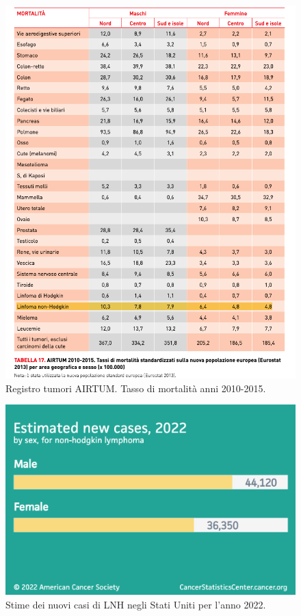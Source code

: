 \begin{figure}[h]
    \begin{center}
    \includegraphics[width=0.8\columnwidth]{img/MORTALITA.png}
    \end{center}
    \caption[Registro tumori AIRTUM. Tasso di mortalità anni 2010-2015.]{Registro tumori AIRTUM. Tasso di mortalità anni 2010-2015.
    \cite{img7}}

\end{figure}

\begin{figure}[h]
    \begin{center}
    \includegraphics[width=0.6\columnwidth]{img/Estimated new cases, 2022 (by sex).png}
    \end{center}
    \caption[Stime dei nuovi casi di LNH negli Stati Uniti per l’anno 2022.]{Stime dei nuovi casi di LNH negli Stati Uniti per l’anno 2022.
    \cite{img8}}

\end{figure}

